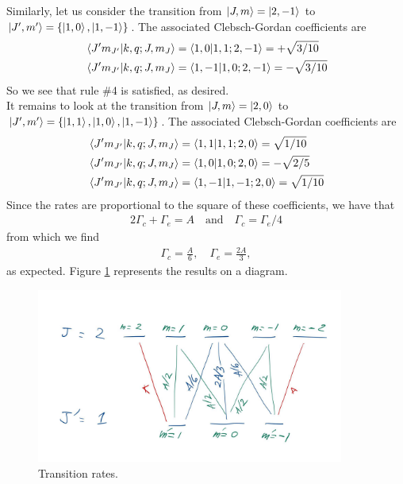 \documentclass{article}
\theoremstyle{definition}
\newcommand{\f}[2]{\frac{#1}{#2}}
\begin{document}
\begin{enumerate}[label=(\alph*)]
	Similarly, let us consider the transition from $\ket{J,m} = \ket{2,-1}$ to $\ket{J',m'} = \{\ket{1,0},\ket{1,-1}\}$. The associated Clebsch-Gordan coefficients are
	\begin{align*}
	&\bra{J'm_{J'}}\ket{k,q; J,m_J} = \bra{1,0}\ket{1,1; 2,-1} =  +\sqrt{3/10}\\
	&\bra{J'm_{J'}}\ket{k,q; J,m_J} = \bra{1,-1}\ket{1,0; 2,-1} =  -\sqrt{3/10}
	\end{align*}
	So we see that rule \#4 is satisfied, as desired. \\
	
	It remains to look at the transition from $\ket{J,m} = \ket{2,0}$ to $\ket{J',m'} = \{ \ket{1,1},\ket{1,0},\ket{1,-1} \}$. The associated Clebsch-Gordan coefficients are
	\begin{align*}
	&\bra{J'm_{J'}}\ket{k,q; J,m_J} = \bra{1,1} \ket{ 1,1 ; 2,0} = \sqrt{1/10} \\ 
	&\bra{J'm_{J'}}\ket{k,q; J,m_J} = \bra{1,0} \ket{ 1, 0 ; 2,0 } = -\sqrt{2/5}\\ 
	&\bra{J'm_{J'}}\ket{k,q; J,m_J} = \bra{1,-1}\ket{ 1, -1 ; 2,0} = \sqrt{1/10}
	\end{align*}
	Since the rates are proportional to the square of these coefficients, we have that 
	\begin{align*}
	2\Gamma_c + \Gamma_e = A \quad\text{and} \quad \Gamma_c = \Gamma_e/4 
	\end{align*}
	from which we find 
	\begin{align*}
	\Gamma_c = \f{A}{6}, \quad \Gamma_e = \f{2A}{3},
	\end{align*}
	as expected. Figure \ref{fig:1} represents the results on a diagram.
	
	
	\begin{figure}[!htb]
		\centering
		\includegraphics[width=0.9\textwidth]{branches.jpg}
		\caption{Transition rates.}
		\label{fig:1}
	\end{figure}
	$\,$\\
	$\,$\\
	$\,$\\
	$\,$\\
	$\,$\\
	$\,$\\
	$\,$\\
	$\,$\\
	$\,$\\
	$\,$\\
	$\,$\\
	$\,$\\
	$\,$\\
	$\,$
	
	
\end{enumerate}
	
	
\end{document}
